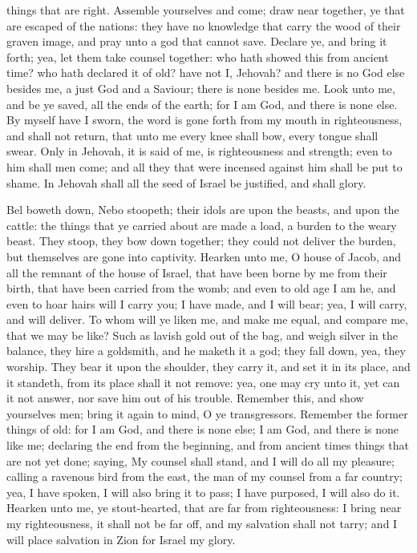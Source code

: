 things that are right.  Assemble yourselves and come; draw near together, ye that are escaped of the nations: they have no knowledge that carry the wood of their graven image, and pray unto a god that cannot save. Declare ye, and bring it forth; yea, let them take counsel together: who hath showed this from ancient time? who hath declared it of old? have not I, Jehovah? and there is no God else besides me, a just God and a Saviour; there is none besides me. Look unto me, and be ye saved, all the ends of the earth; for I am God, and there is none else. By myself have I sworn, the word is gone forth from my mouth in righteousness, and shall not return, that unto me every knee shall bow, every tongue shall swear. Only in Jehovah, it is said of me, is righteousness and strength; even to him shall men come; and all they that were incensed against him shall be put to shame. In Jehovah shall all the seed of Israel be justified, and shall glory. 

Bel boweth down, Nebo stoopeth; their idols are upon the beasts, and upon the cattle: the things that ye carried about are made a load, a burden to the weary beast. They stoop, they bow down together; they could not deliver the burden, but themselves are gone into captivity.  Hearken unto me, O house of Jacob, and all the remnant of the house of Israel, that have been borne by me from their birth, that have been carried from the womb; and even to old age I am he, and even to hoar hairs will I carry you; I have made, and I will bear; yea, I will carry, and will deliver. To whom will ye liken me, and make me equal, and compare me, that we may be like? Such as lavish gold out of the bag, and weigh silver in the balance, they hire a goldsmith, and he maketh it a god; they fall down, yea, they worship. They bear it upon the shoulder, they carry it, and set it in its place, and it standeth, from its place shall it not remove: yea, one may cry unto it, yet can it not answer, nor save him out of his trouble.  Remember this, and show yourselves men; bring it again to mind, O ye transgressors. Remember the former things of old: for I am God, and there is none else; I am God, and there is none like me; declaring the end from the beginning, and from ancient times things that are not yet done; saying, My counsel shall stand, and I will do all my pleasure; calling a ravenous bird from the east, the man of my counsel from a far country; yea, I have spoken, I will also bring it to pass; I have purposed, I will also do it.  Hearken unto me, ye stout-hearted, that are far from righteousness: I bring near my righteousness, it shall not be far off, and my salvation shall not tarry; and I will place salvation in Zion for Israel my glory. 

